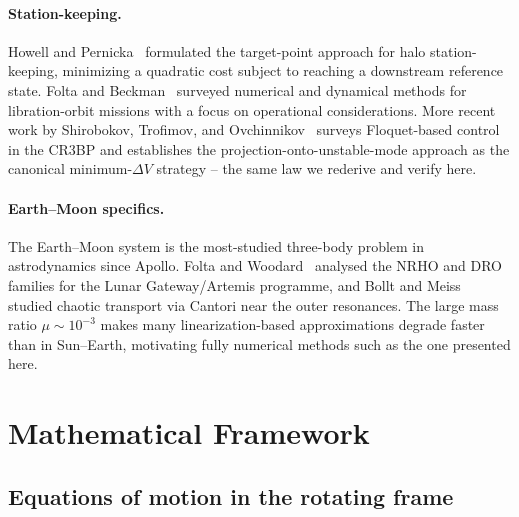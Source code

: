 \documentclass[11pt,a4paper]{article}
\begin{document}
\paragraph{Station-keeping.}
Howell and Pernicka~\cite{howell1993} formulated the target-point approach for halo station-keeping, minimizing a quadratic cost subject to reaching a downstream reference state. Folta and Beckman~\cite{folta2003} surveyed numerical and dynamical methods for libration-orbit missions with a focus on operational considerations. More recent work by Shirobokov, Trofimov, and Ovchinnikov~\cite{shirobokov2017} surveys Floquet-based control in the CR3BP and establishes the projection-onto-unstable-mode approach as the canonical minimum-$\Delta V$ strategy -- the same law we rederive and verify here.

\paragraph{Earth--Moon specifics.}
The Earth--Moon system is the most-studied three-body problem in astrodynamics since Apollo. Folta and Woodard~\cite{anderson2011} analysed the NRHO and DRO families for the Lunar Gateway/Artemis programme, and Bollt and Meiss~\cite{bollt1995} studied chaotic transport via Cantori near the outer resonances. The large mass ratio $\mu \sim 10^{-3}$ makes many linearization-based approximations degrade faster than in Sun--Earth, motivating fully numerical methods such as the one presented here.

\section{Mathematical Framework}\label{sec:math}

\subsection{Equations of motion in the rotating frame}
\end{document}
